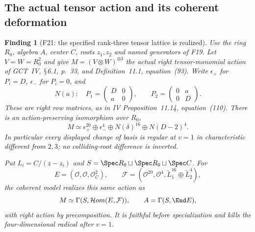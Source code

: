 \documentclass[11pt,a4paper]{article}
\renewcommand{\S}{\ensuremath{\mathsection}}
\newcommand{\fid}[1]{\textsf{#1}}\newcommand{\gate}[1]{\textsf{#1}}
\theoremstyle{named}\newtheorem{finding}{Finding}[section]
\theoremstyle{definition}\newtheorem{definition}[finding]{Definition}
\theoremstyle{remark}\newtheorem{remark}[finding]{Remark}
\begin{document}
\subsection{The actual tensor action and its coherent deformation}
\begin{finding}[\fid{F21}: the specified rank-three tensor lattice is realized]\label{f:r3tensor}
Use the ring $R_0$, algebra $A$, center $C$, roots $z_1,z_2$ and named
generators of \fid{F19}. Let $V=W=R_0^2$ and give
$M=(V\otimes W)^{\otimes3}$ the actual right tensor-monomial action of
GCT~IV, \S6.1, p.~33, and Definition~11.1, equation~(93). Write
$\epsilon_+$ for $P_i=D$, $\epsilon_-$ for $P_i=0$, and
\[
 N(a):\quad P_1=\begin{pmatrix}D&0\\a&0\end{pmatrix},\qquad
 P_2=\begin{pmatrix}0&a\\0&D\end{pmatrix}.
\]
These are right row matrices, as in IV Proposition~11.14,
equation~(110). There is an action-preserving isomorphism over $R_0$,
\begin{equation}\label{eq:r3tensor}
 M\simeq\epsilon_+^{20}\oplus\epsilon_-^4
       \oplus N(\delta)^{16}\oplus N(D-2)^4.
\end{equation}
In particular every displayed change of basis is regular at $v=1$ in
characteristic different from $2,3$; no colliding-root difference is inverted.

Put $L_i=C/(z-z_i)$ and
$S=\Spec R_0\sqcup\Spec R_0\sqcup\Spec C$. For
\[
 E=(\mathcal O,\mathcal O,\mathcal O_C^2),\qquad
 \mathcal F=(\mathcal O^{20},\mathcal O^4,
             \widetilde L_1^{16}\oplus\widetilde L_2^4),
\]
the coherent model realizes this same action as
\[
 M\simeq\Gamma(S,\mathcal Hom(E,\mathcal F)),\qquad A=\Gamma(S,\End E),
\]
with right action by precomposition. It is faithful before specialization
and kills the four-dimensional radical after $v=1$.
\end{finding}
\end{document}
